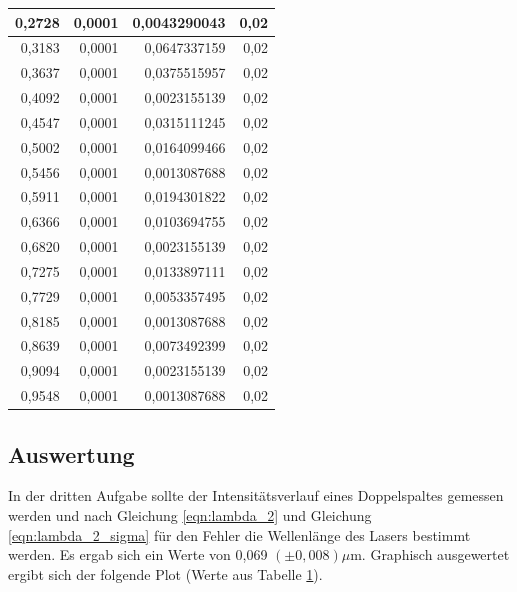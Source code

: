 \documentclass[12pt]{scrartcl}
\begin{document}
\begin{table}[htbp]
\begin{center}
\begin{tabular}{|r|r|r|r|}
0,2728 & 0,0001 & 0,0043290043 & 0,02 \\ \hline
0,3183 & 0,0001 & 0,0647337159 & 0,02 \\ \hline
0,3637 & 0,0001 & 0,0375515957 & 0,02 \\ \hline
0,4092 & 0,0001 & 0,0023155139 & 0,02 \\ \hline
0,4547 & 0,0001 & 0,0315111245 & 0,02 \\ \hline
0,5002 & 0,0001 & 0,0164099466 & 0,02 \\ \hline
0,5456 & 0,0001 & 0,0013087688 & 0,02 \\ \hline
0,5911 & 0,0001 & 0,0194301822 & 0,02 \\ \hline
0,6366 & 0,0001 & 0,0103694755 & 0,02 \\ \hline
0,6820 & 0,0001 & 0,0023155139 & 0,02 \\ \hline
0,7275 & 0,0001 & 0,0133897111 & 0,02 \\ \hline
0,7729 & 0,0001 & 0,0053357495 & 0,02 \\ \hline
0,8185 & 0,0001 & 0,0013087688 & 0,02 \\ \hline
0,8639 & 0,0001 & 0,0073492399 & 0,02 \\ \hline
0,9094 & 0,0001 & 0,0023155139 & 0,02 \\ \hline
0,9548 & 0,0001 & 0,0013087688 & 0,02 \\ \hline
\end{tabular}
\end{center}
\label{tab:a_3_m}
\end{table}


\subsection{Auswertung}
In der dritten Aufgabe sollte der Intensitätsverlauf eines Doppelspaltes gemessen werden und nach Gleichung \ref{eqn:lambda_2} und Gleichung \ref{eqn:lambda_2_sigma} für den Fehler die Wellenlänge des Lasers bestimmt werden. Es ergab sich ein Werte von 0,069 $(\pm 0,008) \mu$m.
Graphisch ausgewertet ergibt sich der folgende Plot (Werte aus Tabelle \ref{tab:a_3_m}).
\end{document}
